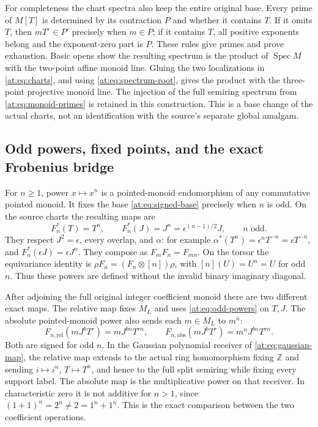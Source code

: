 \documentclass[11pt,a4paper]{article}
\theoremstyle{definition}\newtheorem{definition}[theorem]{Definition}
\newcommand{\Z}{\mathbb Z}\newcommand{\Q}{\mathbb Q}
\newcommand{\Spec}{\operatorname{Spec}}\newcommand{\SpecMon}{\operatorname{Spec}_{\mathrm{mon}}}
\begin{document}
For completeness the chart spectra also keep the entire original
base. Every prime of $M[T]$ is determined by its contraction $P$
and whether it contains $T$. If it omits $T$, then
$mT^r\in P'$ precisely when $m\in P$; if it contains $T$,
all positive exponents belong and the exponent-zero part is $P$.
These rules give primes and prove exhaustion. Basic opens show
the resulting spectrum is the product of $\Spec M$ with the
two-point affine monoid line. Gluing the two localizations in
\eqref{at:eq:charts}, and using \eqref{at:eq:spectrum-root}, gives
the product with the three-point projective monoid line.
The injection of the full semiring spectrum from
\eqref{at:eq:monoid-primes} is retained in this construction.
This is a base change of the actual charts, not an identification
with the source's separate global amalgam.

\subsection{Odd powers, fixed points, and the exact Frobenius bridge}

For $n\ge1$, power $x\mapsto x^n$ is a pointed-monoid
endomorphism of any commutative pointed monoid. It fixes the
base \eqref{at:eq:signed-base} precisely when $n$ is odd. On the
source charts the resulting maps are
\[
 F_n^*(T)=T^n,\qquad F_n^*(J)=J^n=\epsilon^{(n-1)/2}J,
 \qquad n\text{ odd}.
 \tag{AT18}\label{at:eq:odd-powers}
\]
They respect $J^2=\epsilon$, every overlap, and $\alpha$:
for example $\alpha^*(T^n)=\epsilon^nT^{-n}
=\epsilon T^{-n}$, and $F_n^*(\epsilon J)=\epsilon J^n$.
They compose as $F_mF_n=F_{mn}$. On the torsor the equivariance
identity is $\rho F_n=(F_n\otimes[n])\rho$, with
$[n](U)=U^n=U$ for odd $n$. Thus these powers are defined without
the invalid binary imaginary diagonal.

After adjoining the full original integer coefficient monoid there
are two different exact maps. The relative map fixes $M_L$ and
uses \eqref{at:eq:odd-powers} on $T,J$. The absolute pointed-monoid
power also sends each $m\in M_L$ to $m^n$:
\[
 F_{n,\mathrm{rel}}(mJ^bT^r)=mJ^{bn}T^{rn},\qquad
 F_{n,\mathrm{abs}}(mJ^bT^r)=m^nJ^{bn}T^{rn}.
 \tag{AT19}\label{at:eq:two-powers}
\]
Both are signed for odd $n$. In the Gaussian polynomial receiver
of \eqref{at:eq:gaussian-map}, the relative map extends to the actual
ring homomorphism fixing $\Z$ and sending $i\mapsto i^n$,
$T\mapsto T^n$, and hence to the full split semiring while fixing
every support label. The absolute map is the multiplicative power
on that receiver. In characteristic zero it is not additive for
$n>1$, since $(1+1)^n=2^n\ne2=1^n+1^n$. This is the exact
comparison between the two coefficient operations.
\end{document}
